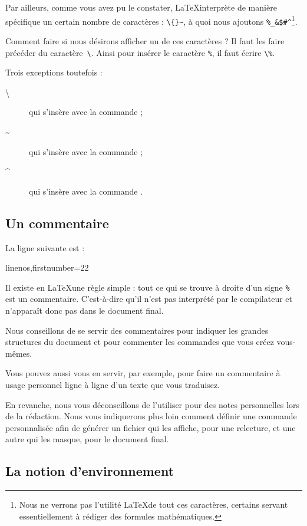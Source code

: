 Par ailleurs, comme vous avez pu le constater, \LaTeX interprète de manière spécifique un certain nombre de caractères : \verb|\{}~|, à quoi nous ajoutons \verb|%_&$#^|\footnote{Nous ne verrons pas l'utilité \LaTeX  de tout ces caractères, certains servant essentiellement à rédiger des formules mathématiques.}.

Comment faire si nous désirons afficher un de ces caractères ? Il faut les faire précéder du caractère~\verb|\|. Ainsi pour insérer le caractère \verb|%|, il faut écrire \verb|\%|. 

Trois exceptions toutefois :
\begin{description}
\item[\textbackslash] qui s'insère avec la commande  ;
\item[\textasciitilde] qui s'insère avec la commande  ; 
\item[\textasciicircum] qui s'insère avec la commande . 
\end{description} 
\subsection{Un commentaire}

La ligne suivante est : 
\begin{latexcode*}{linenos,firstnumber=22}
\end{latexcode*}

Il existe en \LaTeX une règle simple : tout ce qui se trouve à droite d'un signe \verb|%| est un commentaire.
C'est-à-dire qu'il n'est pas interprété par le compilateur et n'apparaît donc pas dans le document final. 

Nous conseillons de se servir des commentaires pour indiquer les grandes structures du document et pour commenter les commandes que vous créez vous-mêmes. 

Vous pouvez aussi vous en servir, par exemple, pour faire un commentaire à usage personnel ligne à ligne d'un texte que vous traduisez.

En revanche, nous vous déconseillons de l'utiliser pour des notes personnelles lors de la rédaction. Nous vous indiquerons plus loin comment définir une commande  personnalisée afin de générer un fichier qui les affiche, pour une relecture, et une autre qui les masque, pour le document final.



\subsection{La notion d'environnement }

